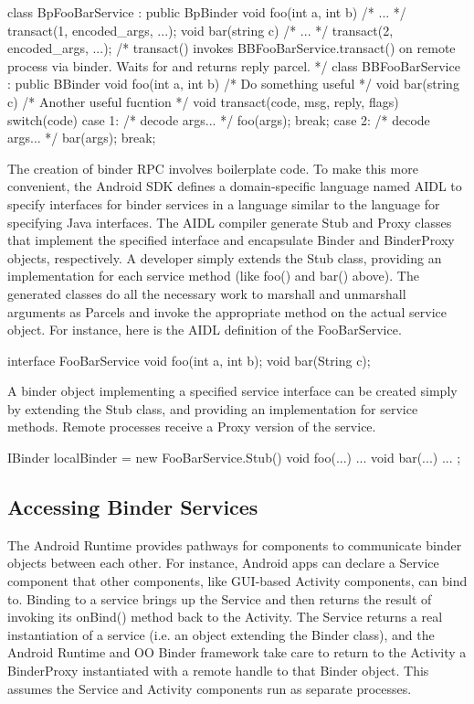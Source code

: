 \documentclass[prodmode]{acmlarge}
\begin{document}
\begin{snippet}
class BpFooBarService : public BpBinder {
  void foo(int a, int b) { /* ... */ transact(1, encoded_args, ...); }
  void bar(string c) { /* ... */ transact(2, encoded_args, ...); }
  /* transact() invokes BBFooBarService.transact() on remote process
     via binder. Waits for and returns reply parcel. */
}
class BBFooBarService : public BBinder {
  void foo(int a, int b) { /* Do something useful */ }
  void bar(string c) { /* Another useful fucntion */ }
  void transact(code, msg, reply, flags) {
    switch(code) {
      case 1: /* decode args... */ foo(args); break;
      case 2: /* decode args... */ bar(args); break;
}}}
\end{snippet}

The creation of binder RPC involves boilerplate code. To make this more convenient, the Android SDK defines a domain-specific language named AIDL to specify interfaces for binder services in a language similar to the language for specifying Java interfaces. The AIDL compiler generate Stub and Proxy classes that implement the specified interface and encapsulate Binder and BinderProxy objects, respectively. A developer simply extends the Stub class, providing an implementation for each service method (like foo() and bar() above). The generated classes do all the necessary work to marshall and unmarshall arguments as Parcels and invoke the appropriate method on the actual service object. For instance, here is the AIDL definition of the FooBarService.

\begin{snippet}
interface FooBarService { void foo(int a, int b); void bar(String c); }
\end{snippet}

A binder object implementing a specified service interface can be created simply by extending the Stub class, and providing an implementation for service methods. Remote processes receive a Proxy version of the service.

\begin{snippet}
IBinder localBinder = new FooBarService.Stub() { void foo(...) { ... }
                                                 void bar(...) { ... } };
\end{snippet}

\subsection{Accessing Binder Services}
The Android Runtime provides pathways for components to communicate binder objects between each other. For instance, Android apps can declare a Service component that other components, like GUI-based Activity components, can bind to. Binding to a service brings up the Service and then returns the result of invoking its onBind() method back to the Activity. The Service returns a real instantiation of a service (i.e. an object extending the Binder class), and the Android Runtime and OO Binder framework take care to return to the Activity a BinderProxy instantiated with a remote handle to that Binder object. This assumes the Service and Activity components run as separate processes.
\end{document}

